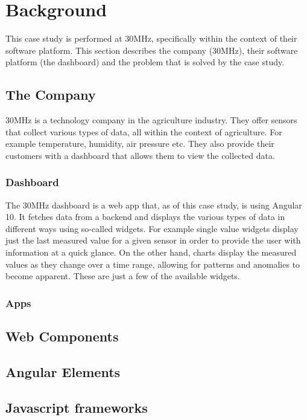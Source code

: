 \section{Background}\label{sec:background}

This case study is performed at 30MHz, specifically within the context of their software platform. This section describes the company (30MHz), their software platform (the dashboard) and the problem that is solved by the case study.

\subsection{The Company}\label{sec:bg-thecompany}
30MHz is a technology company in the agriculture industry. They offer sensors that collect various types of data, all within the context of agriculture. For example temperature, humidity, air pressure etc. They also provide their customers with a dashboard that allows them to view the collected data.

\subsubsection{Dashboard}\label{sec:bg-dashboard}
The 30MHz dashboard is a web app that, as of this case study, is using Angular 10. It fetches data from a backend and displays the various types of data in different ways using so-called widgets. For example single value widgets display just the last measured value for a given sensor in order to provide the user with information at a quick glance. On the other hand, charts display the measured values as they change over a time range, allowing for patterns and anomalies to become apparent. These are just a few of the available widgets.


\subsubsection{Apps}\label{sec:bg-apps}

\subsection{Web Components}\label{sec:bg-webcomponents}

\subsection{Angular Elements}\label{sec:bg-angularelements}

\subsection{Javascript frameworks}\label{sec:bg-jsframeworks}
